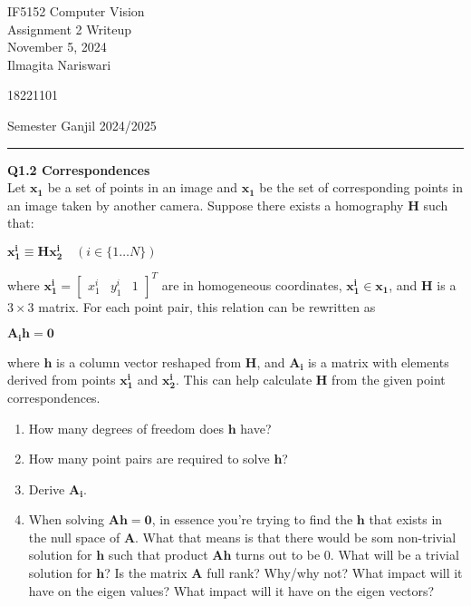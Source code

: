 \documentclass[12pt,letterpaper, onecolumn]{exam}
\begin{document}
\begingroup  
    \centering
    \LARGE IF5152  Computer Vision\\
    \LARGE Assignment 2 Writeup\\[0.5em]
    \large November 5, 2024 \\[0.5em]
    \large Ilmagita Nariswari\par
    \large 18221101\par
    \large Semester Ganjil 2024/2025\par
\endgroup
\rule{\textwidth}{0.4pt}
\pointsdroppedatright   %
\printanswers
\renewcommand{\solutiontitle}{\noindent\textbf{Ans:}\enspace}   %

\begin{questions}

    \question \textbf{Q1.2 Correspondences} \\
    
    Let \(\mathbf{x_1}\) be a set of points in an image and \(\mathbf{x_1}\) be the set of corresponding points in an image taken by another camera. Suppose there exists a homography \(\mathbf{H}\) such that:
    
    \begin{center}
        \(\mathbf{x_1^i} \equiv \mathbf{H} \mathbf{x_2^i} \quad (i \in \{ 1 \dots N \})\)
    \end{center}
    
    where \(\mathbf{x_1^i} = \begin{bmatrix} x_1^i & y_1^i & 1 \end{bmatrix}^T\) are in homogeneous coordinates, \(\mathbf{x_1^i} \in \mathbf{x_1}\), and \(\mathbf{H}\) is a \(3 \times 3\) matrix. For each point pair, this relation can be rewritten as
    \begin{center}
        \(\mathbf{A_ih = 0}\)
    \end{center}
    where \(\mathbf{h}\) is a column vector reshaped from \(\mathbf{H}\), and \(\mathbf{A_i}\) is a matrix with elements derived from points \(\mathbf{x_1^i}\) and \(\mathbf{x_2^i}\). This can help calculate \(\mathbf{H}\) from the given point correspondences.

    \begin{enumerate}
        \item How many degrees of freedom does \(\mathbf{h}\) have?
        \item How many point pairs are required to solve \(\mathbf{h}\)? 
        \item Derive \(\mathbf{A_i}\).
        \item When solving \(\mathbf{Ah = 0}\), in essence you're trying to find the \(\mathbf{h}\) that exists in the null space of \(\mathbf{A}\). What that means is that there would be som non-trivial solution for \(\mathbf{h}\) such that product \(\mathbf{Ah}\) turns out to be 0. What will be a trivial solution for \(\mathbf{h}\)? Is the matrix \(\mathbf{A}\) full rank? Why/why not? What impact will it have on the eigen values? What impact will it have on the eigen vectors?
    \end{enumerate}
    

\end{questions}
\end{document}
